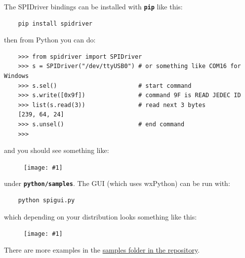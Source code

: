 \documentclass{article}
\newcommand{\png}[2]{
\begin{figure}[H]
\begin{center}
\texttt{[image: \#1]}
\caption{#2}
\end{center}
\end{figure}
}
\newcommand{\mach}[1]{\texttt{\textbf{#1}}}
\begin{document}
The SPIDriver bindings can be installed with \mach{pip} like this:

\begin{lstlisting}
    pip install spidriver
\end{lstlisting}

then from Python you can do:

\begin{lstlisting}
    >>> from spidriver import SPIDriver
    >>> s = SPIDriver("/dev/ttyUSB0") # or something like COM16 for Windows
    >>> s.sel()                       # start command
    >>> s.write([0x9f])               # command 9F is READ JEDEC ID 
    >>> list(s.read(3))               # read next 3 bytes
    [239, 64, 24]
    >>> s.unsel()                     # end command
    >>>
\end{lstlisting}

and you should see something like:

\png{img/spidriver/spidriver-flash}{}

under \mach{python/samples}.
The GUI (which uses wxPython) can be run with:

\begin{lstlisting}
    python spigui.py
\end{lstlisting}

which depending on your distribution looks something like this:

\png{img/spidriver/spidriver-gui-linux}{}

There are more examples in the 
\href{https://github.com/jamesbowman/spidriver/tree/master/python/samples}{samples folder in the repository}.

% 
% 
% 
% 
% 
% 
% 
% 
% 
% 
\end{document}
